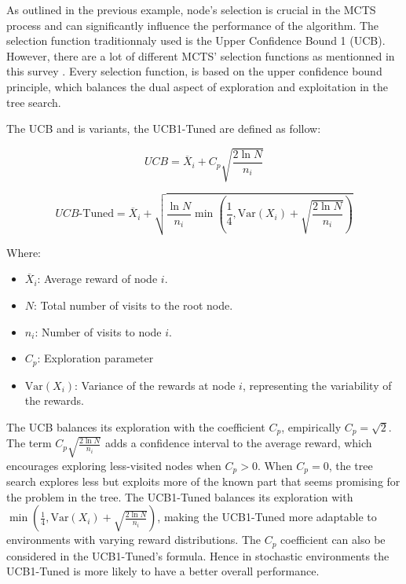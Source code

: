 As outlined in the previous example, node's selection is crucial in the MCTS process and can significantly influence the performance of the algorithm.
The selection function traditionnaly used is the Upper Confidence Bound 1 (UCB). However, there are a lot of different MCTS' selection functions as mentionned in this survey \cite{different_selection_policies}.
Every selection function, is based on the upper confidence bound principle, which balances the dual aspect of exploration and exploitation in the tree search.

The UCB and is variants, the UCB1-Tuned are defined as follow:

\begin{equation}
    UCB = \overline{X}_i + C_p \sqrt{\frac{2 \ln N}{n_i}}
    \label{eq:UCB}
\end{equation}

\begin{equation}
    UCB\text{-Tuned} = \overline{X}_i + \sqrt{\frac{\ln N}{n_i} \min\left(\frac{1}{4}, \mathrm{Var}(X_i) + \sqrt{\frac{2 \ln N}{n_i}}\right)}
    \label{eq:UCB1T}
\end{equation}

Where:
\begin{itemize}
    \item \( \overline{X}_i \): Average reward of node \( i \).
    \item \( N \): Total number of visits to the root node.
    \item \( n_i \): Number of visits to node \( i \).
    \item \( C_p \): Exploration parameter
    \item \( \mathrm{Var}(X_i) \): Variance of the rewards at node \( i \), representing the variability of the rewards.
\end{itemize}

The UCB balances its exploration with the coefficient $C_p$, empirically $C_p=\sqrt2$. The term \( C_p \sqrt{\frac{2 \ln N}{n_i}} \) adds a confidence interval to the average reward, which encourages exploring less-visited nodes when $C_p>0$. When $C_p=0$, the tree search explores less but exploits more of the known part that seems promising for the problem in the tree.
The UCB1-Tuned balances its exploration with \( \min\left(\frac{1}{4}, \mathrm{Var}(X_i) + \sqrt{\frac{2 \ln N}{n_i}}\right) \), making the UCB1-Tuned more adaptable to environments with varying reward distributions. The $C_p$ coefficient can also be considered in the UCB1-Tuned's formula. Hence in stochastic environments the UCB1-Tuned is more likely to have a better overall performance.

